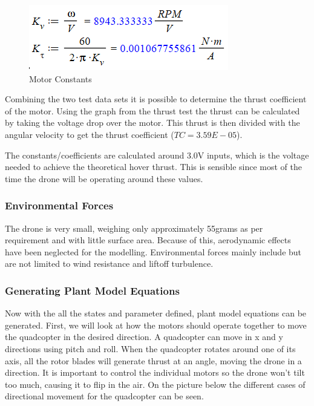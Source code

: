\begin{figure}[H]
\begin{center}
   \includegraphics[scale =1.5]{pictures/control/Motor constants calc.png}
\end{center}
\caption{Motor Constants}
\end{figure}

Combining the two test data sets it is possible to determine the thrust coefficient of the motor. Using the graph from the thrust test the thrust can be calculated by taking the voltage drop over the motor. This thrust is then divided with the angular velocity to get the thrust coefficient ($TC=3.59E-05$).

The constants/coefficients are calculated around 3.0V inputs, which is the voltage needed to achieve the theoretical hover thrust. This is sensible since most of the time the drone will be operating around these values. 

\subsubsection{Environmental Forces}
The drone is very small, weighing only approximately 55grams as per requirement and with little surface area. Because of this, aerodynamic effects have been neglected for the modelling. Environmental forces mainly include but are not limited to wind resistance and liftoff turbulence.

\subsubsection{Generating Plant Model Equations}
Now with the all the states and parameter defined, plant model equations can be generated. 
First, we will look at how the motors should operate together to move the quadcopter in the desired direction. A quadcopter can move in x and y directions using pitch and roll. When the quadcopter rotates around one of its axis, all the rotor blades will generate thrust at an angle, moving the drone in a direction. It is important to control the individual motors so the drone won’t tilt too much, causing it to flip in the air. On the picture below the different cases of directional movement for the quadcopter can be seen.  


